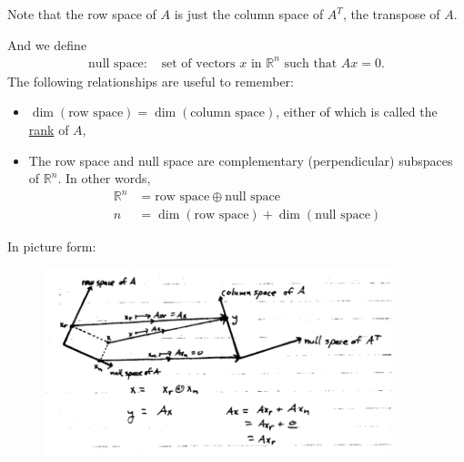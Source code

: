 \begin{enumerate}
    Note that the row space of $A$ is just the column space of $A^T$, the transpose of $A$.
    
    And we define
        \begin{align*}
            \text{null space: } & \text{set of vectors }x\text{ in }\mathbb{R}^n\text{ such that }Ax=0.
        \end{align*}
    The following relationships are useful to remember:
    \begin{itemize}
        \item $\dim(\text{row space}) = \dim(\text{column space})$, either of which is called the \underline{rank} of $A$,
        \item The row space and null space are complementary (perpendicular) subspaces of $\mathbb{R}^n$. In other words, 
        \begin{align*}
            \mathbb{R}^n &= \text{row space}\oplus\text{null space} \\
            n &= \dim(\text{row space}) + \dim(\text{null space})
        \end{align*}
    \end{itemize}
    In picture form:
    \begin{figure}[H]
        \centering
        \includegraphics[width=0.9\textwidth]{figures/linear-1.png}
        \label{fig:linear-1}
    \end{figure}
    

\end{enumerate}
